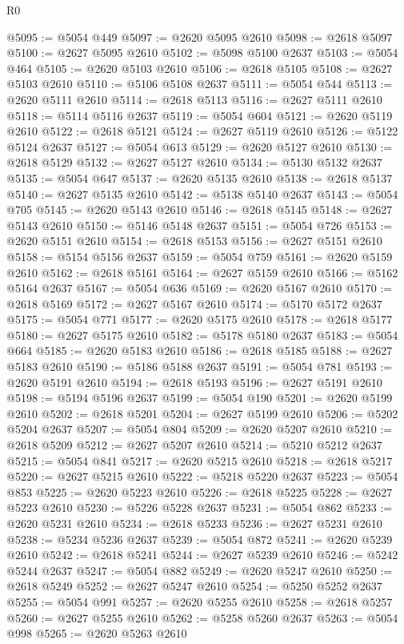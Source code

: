 \begin{lexlean}{R0}
\begin{coremodule}
@5095 := @5054 @449
@5097 := @2620 @5095 @2610
@5098 := @2618 @5097
@5100 := @2627 @5095 @2610
@5102 := @5098 @5100 @2637
@5103 := @5054 @464
@5105 := @2620 @5103 @2610
@5106 := @2618 @5105
@5108 := @2627 @5103 @2610
@5110 := @5106 @5108 @2637
@5111 := @5054 @544
@5113 := @2620 @5111 @2610
@5114 := @2618 @5113
@5116 := @2627 @5111 @2610
@5118 := @5114 @5116 @2637
@5119 := @5054 @604
@5121 := @2620 @5119 @2610
@5122 := @2618 @5121
@5124 := @2627 @5119 @2610
@5126 := @5122 @5124 @2637
@5127 := @5054 @613
@5129 := @2620 @5127 @2610
@5130 := @2618 @5129
@5132 := @2627 @5127 @2610
@5134 := @5130 @5132 @2637
@5135 := @5054 @647
@5137 := @2620 @5135 @2610
@5138 := @2618 @5137
@5140 := @2627 @5135 @2610
@5142 := @5138 @5140 @2637
@5143 := @5054 @705
@5145 := @2620 @5143 @2610
@5146 := @2618 @5145
@5148 := @2627 @5143 @2610
@5150 := @5146 @5148 @2637
@5151 := @5054 @726
@5153 := @2620 @5151 @2610
@5154 := @2618 @5153
@5156 := @2627 @5151 @2610
@5158 := @5154 @5156 @2637
@5159 := @5054 @759
@5161 := @2620 @5159 @2610
@5162 := @2618 @5161
@5164 := @2627 @5159 @2610
@5166 := @5162 @5164 @2637
@5167 := @5054 @636
@5169 := @2620 @5167 @2610
@5170 := @2618 @5169
@5172 := @2627 @5167 @2610
@5174 := @5170 @5172 @2637
@5175 := @5054 @771
@5177 := @2620 @5175 @2610
@5178 := @2618 @5177
@5180 := @2627 @5175 @2610
@5182 := @5178 @5180 @2637
@5183 := @5054 @664
@5185 := @2620 @5183 @2610
@5186 := @2618 @5185
@5188 := @2627 @5183 @2610
@5190 := @5186 @5188 @2637
@5191 := @5054 @781
@5193 := @2620 @5191 @2610
@5194 := @2618 @5193
@5196 := @2627 @5191 @2610
@5198 := @5194 @5196 @2637
@5199 := @5054 @190
@5201 := @2620 @5199 @2610
@5202 := @2618 @5201
@5204 := @2627 @5199 @2610
@5206 := @5202 @5204 @2637
@5207 := @5054 @804
@5209 := @2620 @5207 @2610
@5210 := @2618 @5209
@5212 := @2627 @5207 @2610
@5214 := @5210 @5212 @2637
@5215 := @5054 @841
@5217 := @2620 @5215 @2610
@5218 := @2618 @5217
@5220 := @2627 @5215 @2610
@5222 := @5218 @5220 @2637
@5223 := @5054 @853
@5225 := @2620 @5223 @2610
@5226 := @2618 @5225
@5228 := @2627 @5223 @2610
@5230 := @5226 @5228 @2637
@5231 := @5054 @862
@5233 := @2620 @5231 @2610
@5234 := @2618 @5233
@5236 := @2627 @5231 @2610
@5238 := @5234 @5236 @2637
@5239 := @5054 @872
@5241 := @2620 @5239 @2610
@5242 := @2618 @5241
@5244 := @2627 @5239 @2610
@5246 := @5242 @5244 @2637
@5247 := @5054 @882
@5249 := @2620 @5247 @2610
@5250 := @2618 @5249
@5252 := @2627 @5247 @2610
@5254 := @5250 @5252 @2637
@5255 := @5054 @991
@5257 := @2620 @5255 @2610
@5258 := @2618 @5257
@5260 := @2627 @5255 @2610
@5262 := @5258 @5260 @2637
@5263 := @5054 @998
@5265 := @2620 @5263 @2610

\end{coremodule}
\end{lexlean}
